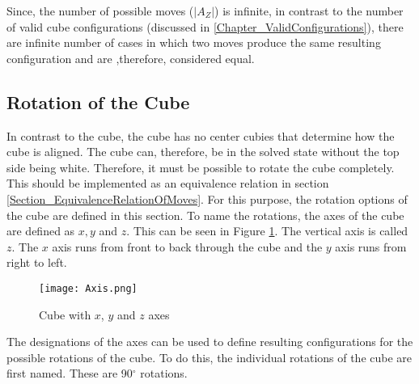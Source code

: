 Since, the number of possible moves ($|A_Z|$) is infinite, in contrast to the number of valid cube configurations (discussed in \ref{Chapter_ValidConfigurations}), there are infinite number of cases in which two moves produce the same resulting configuration and are ,therefore, considered equal. 

\subsection{Rotation of the Cube}

\label{Section_RotationOfCube}

In contrast to the \Tthree cube, the \Ttwo cube has no center cubies that determine how the cube is aligned.
The \Ttwo cube can, therefore, be in the solved state without the top side being white. Therefore, it must be possible to rotate the cube completely.
This should be implemented as an equivalence relation in section \ref{Section_EquivalenceRelationOfMoves}. For this purpose, the rotation options of the cube are defined in this section.
To name the rotations, the axes of the cube are defined as $x, y$ and $z$. This can be seen in Figure \ref{Image_Axes of Rotation}. The vertical axis is called $z$. The $x$ axis runs from front to back through the cube and the $y$ axis runs from right to left.
\begin{figure}[H]
\centering
\texttt{[image: Axis.png]}
\caption[Cube with $x, y$ and $z$ axes]{Cube with $x$, $y$ and $z$ axes}
\label{Image_Axes of Rotation}
\end{figure}

The designations of the axes can be used to define resulting configurations for the possible rotations of the cube.
To do this, the individual rotations of the cube are first named. These are 90$^\circ$ rotations.


